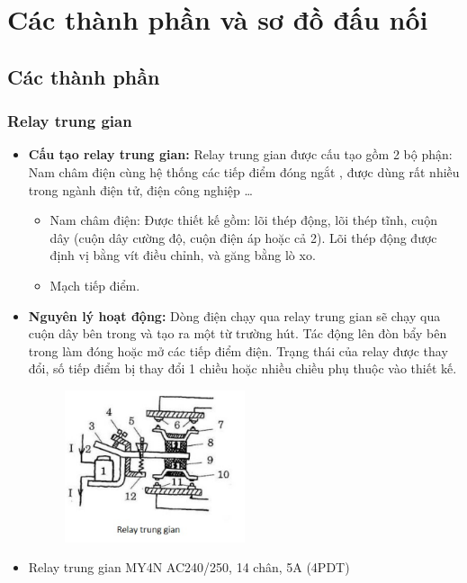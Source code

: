 \section{Các thành phần và sơ đồ đấu nối}
\subsection{Các thành phần}
\subsubsection{Relay trung gian}
\begin{itemize}
    \item \textbf{Cấu tạo relay trung gian:} Relay trung gian được cấu tạo gồm 2 bộ phận: Nam châm điện cùng hệ thống các tiếp điểm đóng ngắt 
    , được dùng rất nhiều trong ngành điện tử, điện công nghiệp \dots
    \begin{itemize}
        \item Nam châm điện: Được thiết kế gồm: lõi thép động, lõi thép tĩnh, cuộn dây
        (cuộn dây cường độ, cuộn điện áp hoặc cả 2). Lõi thép động được định vị bằng vít điều chỉnh, và găng bằng lò xo. 
        \item Mạch tiếp điểm. 
    \end{itemize}
    \item \textbf{Nguyên lý hoạt động:} Dòng điện chạy qua relay trung gian sẽ chạy qua cuộn dây bên trong và tạo ra một từ trường hút. Tác động lên đòn bẩy bên trong làm đóng hoặc mở các tiếp điểm điện. Trạng thái của relay được thay đổi, số tiếp điểm bị
    thay đổi 1 chiều hoặc nhiều chiều phụ thuộc vào thiết kế.
    \begin{figure}[H]
        \centering
        \includegraphics[width=0.5\textwidth]{pictures/NLHD_relay.png}
    \end{figure}
    \item Relay trung gian MY4N AC240/250, 14 chân, 5A (4PDT)
    \begin{figure}[H]

\end{figure}
\end{itemize}
